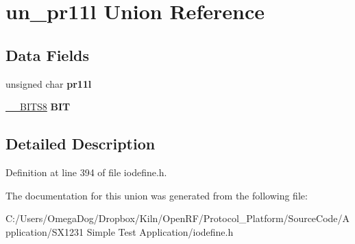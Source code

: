 \hypertarget{unionun__pr11l}{\section{un\-\_\-pr11l Union Reference}
\label{unionun__pr11l}
}
\subsection*{Data Fields}
\begin{DoxyCompactItemize}
\item 
\hypertarget{unionun__pr11l_a409af0e5e9a78a3171abab81b0535634}{unsigned char {\bfseries pr11l}}\label{unionun__pr11l_a409af0e5e9a78a3171abab81b0535634}

\item 
\hypertarget{unionun__pr11l_a267363ad541946fb4474ef00dee4bf22}{\hyperlink{struct_____b_i_t_s8}{\-\_\-\-\_\-\-B\-I\-T\-S8} {\bfseries B\-I\-T}}\label{unionun__pr11l_a267363ad541946fb4474ef00dee4bf22}

\end{DoxyCompactItemize}


\subsection{Detailed Description}


Definition at line 394 of file iodefine.\-h.



The documentation for this union was generated from the following file\-:\begin{DoxyCompactItemize}
\item 
C\-:/\-Users/\-Omega\-Dog/\-Dropbox/\-Kiln/\-Open\-R\-F/\-Protocol\-\_\-\-Platform/\-Source\-Code/\-Application/\-S\-X1231 Simple Test Application/iodefine.\-h\end{DoxyCompactItemize}

